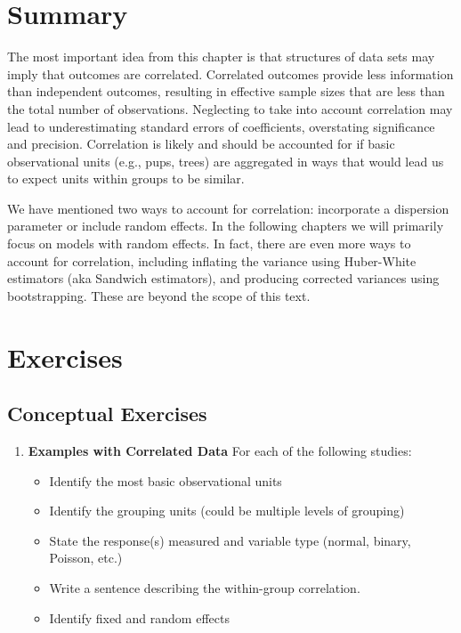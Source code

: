 \documentclass[
]{krantz}
\providecommand{\tightlist}{%
  \setlength{\itemsep}{0pt}\setlength{\parskip}{0pt}}
\begin{document}
\hypertarget{summary-2}{%
\section{Summary}\label{summary-2}}

The most important idea from this chapter is that structures of data sets may imply that outcomes are correlated. Correlated outcomes provide less information than independent outcomes, resulting in effective sample sizes that are less than the total number of observations. Neglecting to take into account correlation may lead to underestimating standard errors of coefficients, overstating significance and precision. Correlation is likely and should be accounted for if basic observational units (e.g., pups, trees) are aggregated in ways that would lead us to expect units within groups to be similar.

We have mentioned two ways to account for correlation: incorporate a dispersion parameter or include random effects. In the following chapters we will primarily focus on models with random effects. In fact, there are even more ways to account for correlation, including inflating the variance using Huber-White estimators (aka Sandwich estimators), and producing corrected variances using bootstrapping. These are beyond the scope of this text.

\hypertarget{exercises-6}{%
\section{Exercises}\label{exercises-6}}

\hypertarget{conceptual-exercises-4}{%
\subsection{Conceptual Exercises}\label{conceptual-exercises-4}}

\begin{enumerate}
\def\labelenumi{\arabic{enumi}.}
\tightlist
\item
  \textbf{Examples with Correlated Data} For each of the following studies:

  \begin{itemize}
  \tightlist
  \item
    Identify the most basic observational units
  \item
    Identify the grouping units (could be multiple levels of grouping)
  \item
    State the response(s) measured and variable type (normal, binary, Poisson, etc.)
  \item
    Write a sentence describing the within-group correlation.
  \item
    Identify fixed and random effects
  \end{itemize}
\end{enumerate}
\end{document}
